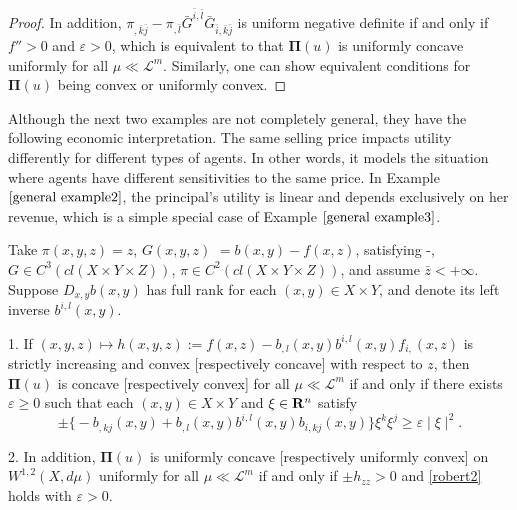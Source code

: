 \begin{proof}
	In addition, $\pi_{,\bar{k}\bar{j}}-\pi_{,\bar{l}}\bar{G}^{\bar i,\bar l}\bar{G}_{\bar{i},\bar{k}\bar{j}}$ is uniform negative definite if and only if $f''>0$ and $\varepsilon>0$, which is equivalent to that $\pmb \Pi(u)$ is uniformly concave uniformly for all $\mu\ll \mathcal{L}^m$. Similarly, one can show equivalent conditions for $\pmb \Pi(u)$ being convex or uniformly convex.
\end{proof}

Although 
the next two examples are not completely general, they have the following economic interpretation. The same selling price impacts utility differently for different types of agents. In other words, it models the situation where agents have different sensitivities to the same price.  In Example $\ref{general example2}$,  the principal's utility is linear and depends exclusively on her revenue, which is a simple special case of Example $\ref{general example3}$.
\medskip

\begin{example}\label{general example2}
	Take $\pi(x, y, z) =z$,  $G(x,y,z)$ $= b(x,y)-f(x,z)$,  satisfying \Gzero-\Gsix,  $G \in C^3(cl(X\times Y \times Z)
	)$, $\pi \in C^2(cl(X\times Y \times Z)
	)$, and assume $\bar{z}<+\infty$. Suppose $D_{x,y}b(x,y)$ has full rank for each $(x,y) \in X\times Y$, and denote its left inverse $b^{i,l}(x,y).$
	
	1. If $(x,y,z)\longmapsto h(x,y,z):=f(x,z)-b_{,l}(x,y)b^{i,l}(x,y)f_{i,}(x,z)$ is strictly increasing and convex [respectively concave] with respect to $z$, then $\pmb \Pi(u)$ is concave [respectively convex]  for all $\mu\ll \mathcal{L}^m$ if and only if there exists $\varepsilon \ge 0$ such that each $(x,y) \in X \times Y$ and $\xi \in {\mathbf R}^{n}$ satisfy
	\begin{equation}\label{robert2}
	\pm \Big\{-b_{,kj}(x,y)+b_{,l}(x,y)b^{i,l}(x,y) b_{i,kj}(x,y)\Big\} \xi^{k}\xi^{j} \ge  \varepsilon \mid \xi\mid ^2.
	\end{equation}
	
	2. In addition, $\pmb \Pi(u)$ is uniformly concave [respectively uniformly convex] on $W^{1,2}(X,d\mu)$ uniformly for all $\mu\ll \mathcal{L}^m$ if and only  if $\pm h_{zz}> 0$ and \eqref{robert2} holds with $\varepsilon >0$.
	
\end{example}



